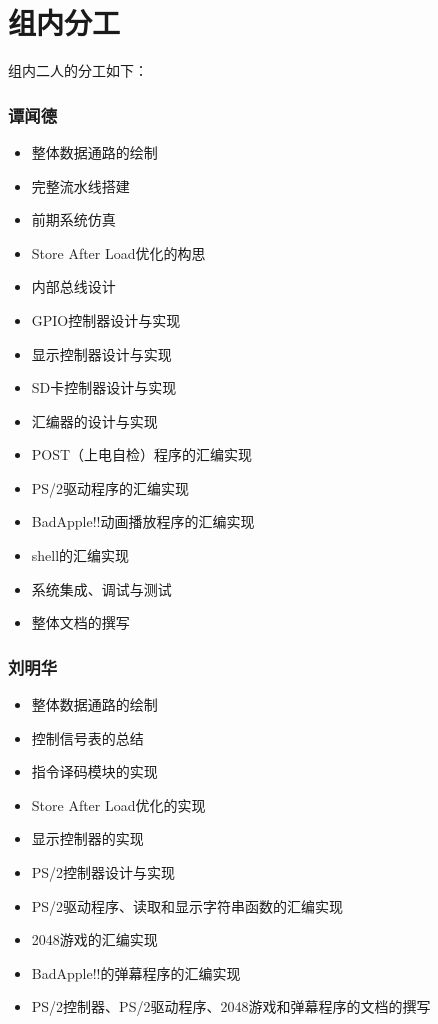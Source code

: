 \documentclass[11pt,utf8]{report}
\begin{document}
\section{组内分工}
组内二人的分工如下：
\begin{multicols}{2}
\subsubsection*{谭闻德}
\begin{itemize}
	\item 整体数据通路的绘制
	\item 完整流水线搭建
	\item 前期系统仿真
	\item Store After Load优化的构思
	\item 内部总线设计
	\item GPIO控制器设计与实现
	\item 显示控制器设计与实现
	\item SD卡控制器设计与实现
	\item 汇编器的设计与实现
	\item POST（上电自检）程序的汇编实现
	\item PS/2驱动程序的汇编实现
	\item BadApple!!动画播放程序的汇编实现
	\item shell的汇编实现
	\item 系统集成、调试与测试
	\item 整体文档的撰写
\end{itemize}
\columnbreak
\subsubsection*{刘明华}
\begin{itemize}
	\item 整体数据通路的绘制
	\item 控制信号表的总结
	\item 指令译码模块的实现
	\item Store After Load优化的实现
	\item 显示控制器的实现
	\item PS/2控制器设计与实现
	\item PS/2驱动程序、读取和显示字符串函数的汇编实现
	\item 2048游戏的汇编实现
	\item BadApple!!的弹幕程序的汇编实现
	\item PS/2控制器、PS/2驱动程序、2048游戏和弹幕程序的文档的撰写
\end{itemize}
\end{multicols}
\end{document}
